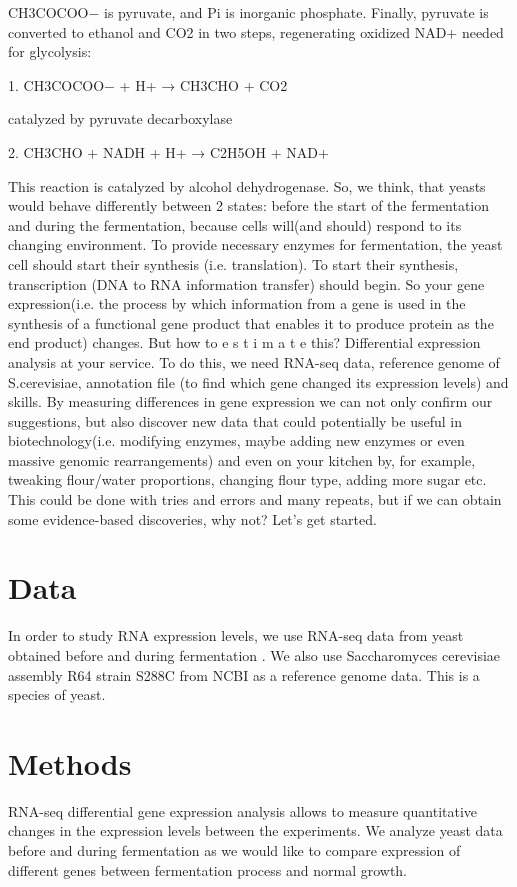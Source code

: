 \documentclass{article}
\begin{document}
 CH3COCOO− is pyruvate, and Pi is inorganic phosphate. Finally, pyruvate is converted to ethanol and CO2 in two steps, regenerating oxidized NAD+ needed for glycolysis:
 
 1. CH3COCOO− + H+ → CH3CHO + CO2
 
 catalyzed by pyruvate decarboxylase
 
 2. CH3CHO + NADH + H+ → C2H5OH + NAD+
 
 This reaction is catalyzed by alcohol dehydrogenase.
 So, we think, that yeasts would behave differently between 2 states: before the start of the fermentation and during the fermentation, because cells will(and should) respond to its changing environment. To provide necessary enzymes for fermentation, the yeast cell should start their synthesis (i.e. translation). To start their synthesis, transcription (DNA to RNA information transfer) should begin. So your gene expression(i.e. the process by which information from a gene is used in the synthesis of a functional gene product that enables it to produce protein as the end product\cite{3}) changes. But how to e s t i m a t e this? Differential expression analysis at your service. To do this, we need RNA-seq data, reference genome of S.cerevisiae, annotation file (to find which gene changed its expression levels) and skills. By measuring differences in gene expression we can not only confirm our suggestions, but also discover new data that could potentially be useful in biotechnology(i.e. modifying enzymes, maybe adding new enzymes or even massive genomic rearrangements) and even on your kitchen by, for example, tweaking flour/water proportions, changing flour type, adding more sugar etc. This could be done with tries and errors and many repeats, but if we can obtain some evidence-based discoveries, why not?
 Let's get started.
 
 
 \section{Data}
In order to study RNA expression levels, we use RNA-seq data from yeast obtained before and during fermentation \cite{data}. We also use Saccharomyces cerevisiae assembly R64  strain S288C from NCBI \cite{ncb} as a reference genome data. This is a species of yeast. 


\section{Methods}
 RNA-seq differential gene expression analysis allows to measure  quantitative changes in the expression levels between the experiments.  We analyze yeast data before and during fermentation as we would like to compare expression of  different genes between  fermentation process and normal growth. 
 
\end{document}
